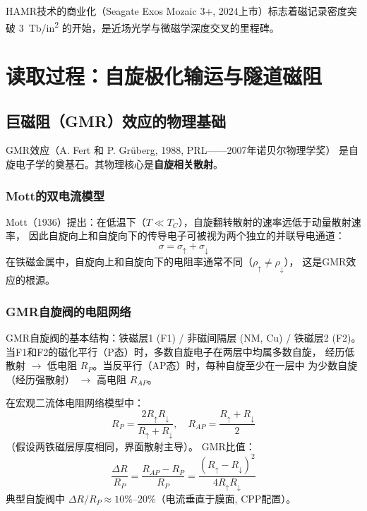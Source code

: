\documentclass[11pt,a4paper,twoside]{article}
\theoremstyle{definition}
\theoremstyle{plain}
\theoremstyle{remark}
\begin{document}
HAMR技术的商业化（Seagate Exos Mozaic 3+, 2024上市）标志着磁记录密度突破
\SI{3}{Tb/in^2} 的开始，是近场光学与微磁学深度交叉的里程碑。

\section{读取过程：自旋极化输运与隧道磁阻}
\label{sec:reading}

\subsection{巨磁阻（GMR）效应的物理基础}

GMR效应（A. Fert 和 P. Gr\"{u}berg, 1988, PRL——2007年诺贝尔物理学奖）
是自旋电子学的奠基石。其物理核心是\textbf{自旋相关散射}。

\subsubsection{Mott的双电流模型}

Mott（1936）提出：在低温下（$T \ll T_C$），自旋翻转散射的速率远低于动量散射速率，
因此自旋向上和自旋向下的传导电子可被视为两个独立的并联导电通道：
\begin{equation}
  \sigma = \sigma_\uparrow + \sigma_\downarrow
\end{equation}
在铁磁金属中，自旋向上和自旋向下的电阻率通常不同（$\rho_\uparrow \neq \rho_\downarrow$），
这是GMR效应的根源。

\subsubsection{GMR自旋阀的电阻网络}

GMR自旋阀的基本结构：铁磁层1 (F1) / 非磁间隔层 (NM, Cu) / 铁磁层2 (F2)。
当F1和F2的磁化平行（P态）时，多数自旋电子在两层中均属多数自旋，
经历低散射 $\rightarrow$ 低电阻 $R_P$。当反平行（AP态）时，每种自旋至少在一层中
为少数自旋（经历强散射） $\rightarrow$ 高电阻 $R_{AP}$。

在宏观二流体电阻网络模型中：
\begin{equation}
  R_P = \frac{2R_\uparrow R_\downarrow}{R_\uparrow + R_\downarrow}, \quad
  R_{AP} = \frac{R_\uparrow + R_\downarrow}{2}
\end{equation}
（假设两铁磁层厚度相同，界面散射主导）。
GMR比值：
\begin{equation}
  \frac{\Delta R}{R_P} = \frac{R_{AP} - R_P}{R_P}
  = \frac{(R_\uparrow - R_\downarrow)^2}{4 R_\uparrow R_\downarrow}
\end{equation}
典型自旋阀中 $\Delta R/R_P \approx 10\%$--$20\%$（电流垂直于膜面, CPP配置）。
\end{document}
